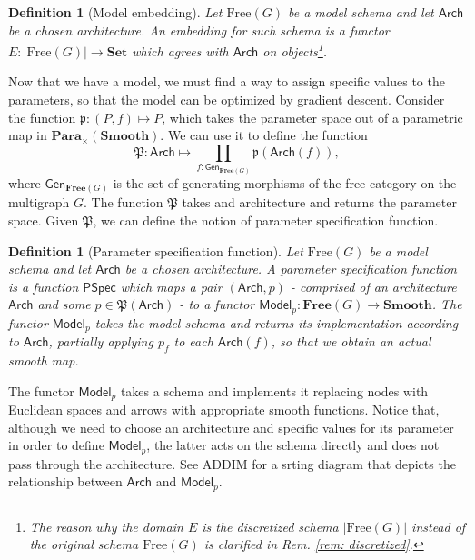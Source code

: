 \documentclass[11pt,a4paper,openright,twoside]{report}
\theoremstyle{plain}
\newtheorem{definition}[proposition]{Definition}
\theoremstyle{definition}
\begin{document}
\begin{definition}[Model embedding]
  Let $\mathrm{Free}(G)$ be a model schema and let $\mathsf{Arch}$ be a chosen architecture. An embedding for such schema is a functor $E: |\mathrm{Free}(G)| \to \mathbf{Set}$ which agrees with $\mathsf{Arch}$ on objects\footnote{The reason why the domain $E$ is the discretized schema $|\mathrm{Free}(G)|$ instead of the original schema $\mathrm{Free}(G)$ is clarified in \textit{Rem. \ref{rem: discretized}}.}.
\end{definition}

Now that we have a model, we must find a way to assign specific values to the parameters, so that the model can be optimized by gradient descent. Consider the function $\mathfrak{p}: (P,f) \mapsto P$, which takes the parameter space out of a parametric map in $\mathbf{Para}_{\times}(\mathbf{Smooth})$. We can use it to define the function 
\[\mathfrak{P}: \mathsf{Arch} \mapsto \prod_{f : \mathsf{Gen}_{\mathbf{Free}(G)}}\mathfrak{p}(\mathsf{Arch}(f)),\]
where $\mathsf{Gen}_{\mathbf{Free}(G)}$ is the set of generating morphisms of the free category on the multigraph $G$. The function $\mathfrak{P}$ takes and architecture and returns the parameter space. Given $\mathfrak{P}$, we can define the notion of parameter specification function.

\begin{definition}[Parameter specification function]
  Let $\mathrm{Free}(G)$ be a model schema and let $\mathsf{Arch}$ be a chosen architecture. A parameter specification function is a function $\mathsf{PSpec}$ which maps a pair $(\mathsf{Arch}, p)$ - comprised of an architecture $\mathsf{Arch}$ and some $p \in \mathfrak{P}(\mathsf{Arch})$ - to a functor $\mathsf{Model}_p: \mathbf{Free}(G) \to \mathbf{Smooth}$. The functor $\mathsf{Model}_p$ takes the model schema and returns its implementation according to $\mathsf{Arch}$, partially applying $p_f$ to each $\mathsf{Arch}(f)$, so that we obtain an actual smooth map. 
\end{definition}

The functor $\mathsf{Model}_p$ takes a schema and implements it replacing nodes with Euclidean spaces and arrows with appropriate smooth functions. Notice that, although we need to choose an architecture and specific values for its parameter in order to define $\mathsf{Model}_p$, the latter acts on the schema directly and does not pass through the architecture. See ADDIM for a srting diagram that depicts the relationship between $\mathsf{Arch}$ and $\mathsf{Model}_p$.
\end{document}
